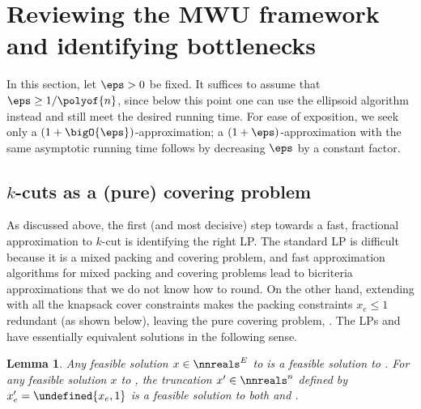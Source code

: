 \documentclass[11pt]{article}
\numberwithin{equation}{section}
\newtheorem{lemma}[theorem]{Lemma}
\theoremstyle{definition}
\theoremstyle{plain}
\let\minof\undefined\usepackage{math} %
\begin{document}
\section{Reviewing the MWU framework and identifying bottlenecks}


In this section, let $\eps > 0$ be fixed. It suffices to assume that
$\eps \geq 1 / \polyof{n}$, since below this point one can use the
ellipsoid algorithm instead and still meet the desired running
time. For ease of exposition, we seek only a
%
$(1 + \bigO{\eps})$-approximation; a %
$(1 + \eps)$-approximation with the same
asymptotic running time follows by decreasing $\eps$ by a constant
factor.

\subsection{$k$-cuts as a (pure) covering problem}
As discussed above, the first (and most decisive) step towards a fast,
fractional approximation to $k$-cut is identifying the right LP. The
standard LP  is difficult because it is a mixed
packing and covering problem, and fast approximation algorithms for
mixed packing and covering problems lead to bicriteria approximations
that we do not know how to round. On the other hand, extending
 with all the knapsack cover constraints makes the
packing constraints $x_e \leq 1$ redundant (as shown below), leaving
the pure covering problem, . The LPs 
and  have essentially equivalent solutions in the
following sense.
\begin{lemma}
   Any feasible solution $x \in \nnreals^E$ to
   is a feasible solution to . For any
  feasible solution $x$ to , the truncation
  $x' \in \nnreals^n$ defined by $x_e' = \minof{x_e,1}$ is a feasible
  solution to both  and .
\end{lemma}
\end{document}
